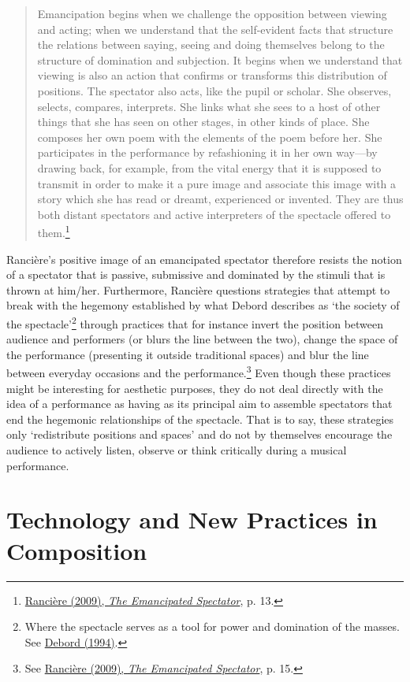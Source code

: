 \begin{quote}
Emancipation begins when we challenge the opposition between viewing and acting; when we understand that the self-evident facts that structure the relations between saying, seeing and doing themselves belong to the structure of domination and subjection. It begins when we understand that viewing is also an action that confirms or transforms this distribution of positions. The spectator also acts, like the pupil or scholar. She observes, selects, compares, interprets. She links what she sees to a host of other things that she has seen on other stages, in other kinds of place. She composes her own poem with the elements of the poem before her. She participates in the performance by refashioning it in her own way---by drawing back, for example, from the vital energy that it is supposed to transmit in order to make it a pure image and associate this image with a story which she has read or dreamt, experienced or invented. They are thus both distant spectators and active interpreters of the spectacle offered to them.\footnote{\hyperlink{ranspec}{Ranci\`{e}re (2009), \emph{The Emancipated Spectator}}, p. 13.}
\end{quote}

Ranci\`{e}re's positive image of an emancipated spectator therefore resists the notion of a spectator that is passive, submissive and dominated by the stimuli that is thrown at him/her. Furthermore, Ranci\`{e}re questions strategies that attempt to break with the hegemony established by what Debord describes as `the society of the spectacle'\footnote{Where the spectacle serves as a tool for power and domination of the masses. See \hyperlink{debord}{Debord (1994)}.} through practices that for instance invert the position between audience and performers (or blurs the line between the two), change the space of the performance (presenting it outside traditional spaces) and blur the line between everyday occasions and the performance.\footnote{See \hyperlink{ranspec}{Ranci\`{e}re (2009), \emph{The Emancipated Spectator}}, p. 15.} Even though these practices might be interesting for aesthetic purposes, they do not deal directly with the idea of a performance as having as its principal aim to assemble spectators that end the hegemonic relationships of the spectacle. That is to say, these strategies only `redistribute positions and spaces' and do not by themselves encourage the audience to actively listen, observe or think critically during a musical performance. 

\section{Technology and New Practices in Composition}

